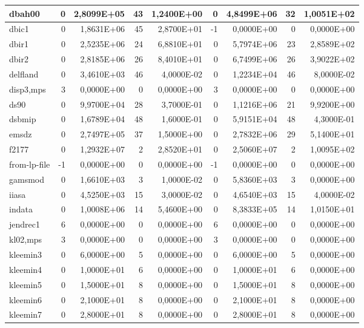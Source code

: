 \begin{tabular}{|l|r|r|r|r|r|r|r|r|}
dbah00 & 0 & 2,8099E+05 & 43 & 1,2400E+00 & 0 & 4,8499E+06 & 32 & 1,0051E+02 \\ \hline
dbic1 & 0 & 1,8631E+06 & 45 & 2,8700E+01 & -1 & 0,0000E+00 & 0 & 0,0000E+00 \\ \hline
dbir1 & 0 & 2,5235E+06 & 24 & 6,8810E+01 & 0 & 5,7974E+06 & 23 & 2,8589E+02 \\ \hline
dbir2 & 0 & 2,8185E+06 & 26 & 8,4010E+01 & 0 & 6,7499E+06 & 26 & 3,9022E+02 \\ \hline
delfland & 0 & 3,4610E+03 & 46 & 4,0000E-02 & 0 & 1,2234E+04 & 46 & 8,0000E-02 \\ \hline
disp3,mps & 3 & 0,0000E+00 & 0 & 0,0000E+00 & 3 & 0,0000E+00 & 0 & 0,0000E+00 \\ \hline
ds90 & 0 & 9,9700E+04 & 28 & 3,7000E-01 & 0 & 1,1216E+06 & 21 & 9,9200E+00 \\ \hline
dsbmip & 0 & 1,6789E+04 & 48 & 1,6000E-01 & 0 & 5,9151E+04 & 48 & 4,3000E-01 \\ \hline
emsdz & 0 & 2,7497E+05 & 37 & 1,5000E+00 & 0 & 2,7832E+06 & 29 & 5,1400E+01 \\ \hline
f2177 & 0 & 1,2932E+07 & 2 & 2,8520E+01 & 0 & 2,5060E+07 & 2 & 1,0095E+02 \\ \hline
from-lp-file & -1 & 0,0000E+00 & 0 & 0,0000E+00 & -1 & 0,0000E+00 & 0 & 0,0000E+00 \\ \hline
gamsmod & 0 & 1,6610E+03 & 3 & 1,0000E-02 & 0 & 5,8360E+03 & 3 & 0,0000E+00 \\ \hline
iiasa & 0 & 4,5250E+03 & 15 & 3,0000E-02 & 0 & 4,6540E+03 & 15 & 4,0000E-02 \\ \hline
indata & 0 & 1,0008E+06 & 14 & 5,4600E+00 & 0 & 8,3833E+05 & 14 & 1,0150E+01 \\ \hline
jendrec1 & 6 & 0,0000E+00 & 0 & 0,0000E+00 & 6 & 0,0000E+00 & 0 & 0,0000E+00 \\ \hline
kl02,mps & 3 & 0,0000E+00 & 0 & 0,0000E+00 & 3 & 0,0000E+00 & 0 & 0,0000E+00 \\ \hline
kleemin3 & 0 & 6,0000E+00 & 5 & 0,0000E+00 & 0 & 6,0000E+00 & 5 & 0,0000E+00 \\ \hline
kleemin4 & 0 & 1,0000E+01 & 6 & 0,0000E+00 & 0 & 1,0000E+01 & 6 & 0,0000E+00 \\ \hline
kleemin5 & 0 & 1,5000E+01 & 8 & 0,0000E+00 & 0 & 1,5000E+01 & 8 & 0,0000E+00 \\ \hline
kleemin6 & 0 & 2,1000E+01 & 8 & 0,0000E+00 & 0 & 2,1000E+01 & 8 & 0,0000E+00 \\ \hline
kleemin7 & 0 & 2,8000E+01 & 8 & 0,0000E+00 & 0 & 2,8000E+01 & 8 & 0,0000E+00 \\ \hline

\end{tabular}
